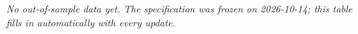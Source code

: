 \emph{No out-of-sample data yet. The specification was frozen on 2026-10-14; this table fills in automatically with every update.}
